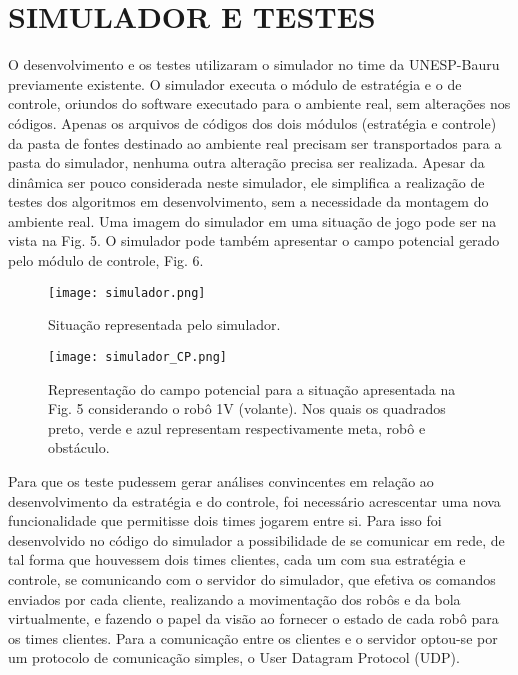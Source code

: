 
\section{SIMULADOR E TESTES}

O desenvolvimento e os testes utilizaram o simulador no
time da UNESP-Bauru previamente existente. O simulador
executa o m{\'o}dulo de estrat{\'e}gia e o de controle, oriundos do
software executado para o ambiente real, sem altera{\c c}ões nos
c{\'o}digos. Apenas os arquivos de c{\'o}digos dos dois m{\'o}dulos
(estrat{\'e}gia e controle) da pasta de fontes destinado ao ambiente
real precisam ser transportados para a pasta do simulador,
nenhuma outra altera{\c c}{\~a}o precisa ser realizada. Apesar da
din{\^a}mica ser pouco considerada neste simulador, ele simplifica
a realiza{\c c}{\~a}o de testes dos algoritmos em desenvolvimento, sem
a necessidade da montagem do ambiente real. Uma imagem do
simulador em uma situa{\c c}{\~a}o de jogo pode ser na vista na Fig. 5.
O simulador pode tamb{\'e}m apresentar o campo potencial
gerado pelo m{\'o}dulo de controle, Fig. 6.

\begin{figure}[!htb]
\centering
\texttt{[image: simulador.png]}
\caption{Situa{\c c}{\~a}o representada pelo simulador.}
\label{Rotulo}
\end{figure}

\begin{figure}[!htb]
\centering
\texttt{[image: simulador\_CP.png]}
\caption{Representa{\c c}{\~a}o do campo potencial para a situa{\c c}{\~a}o apresentada na
Fig. 5 considerando o rob{\^o} 1V (volante). Nos quais os quadrados preto, verde
e azul representam respectivamente meta, rob{\^o} e obst{\'a}culo.}
\label{Rotulo}
\end{figure}

Para que os teste pudessem gerar an{\'a}lises convincentes em
rela{\c c}{\~a}o ao desenvolvimento da estrat{\'e}gia e do controle, foi
necess{\'a}rio acrescentar uma nova funcionalidade que
permitisse dois times jogarem entre si. Para isso foi
desenvolvido no c{\'o}digo do simulador a possibilidade de se
comunicar em rede, de tal forma que houvessem dois times
clientes, cada um com sua estrat{\'e}gia e controle, se
comunicando com o servidor do simulador, que efetiva os
comandos enviados por cada cliente, realizando a
movimenta{\c c}{\~a}o dos rob{\^o}s e da bola virtualmente, e fazendo o
papel da vis{\~a}o ao fornecer o estado de cada rob{\^o} para os times
clientes. Para a comunica{\c c}{\~a}o entre os clientes e o servidor
optou-se por um protocolo de comunica{\c c}{\~a}o simples, o User
Datagram Protocol (UDP).

